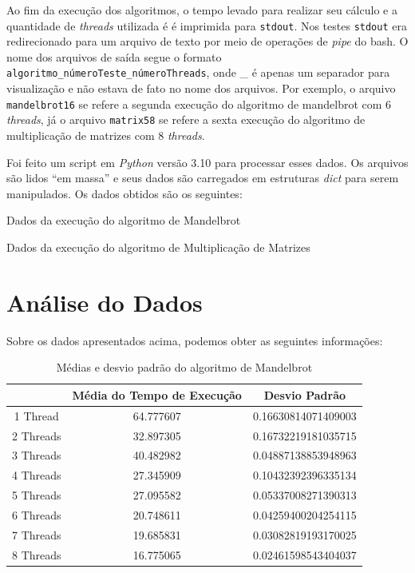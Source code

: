 \documentclass[10pt,a4paper]{article}
\begin{document}
		Ao fim da execução dos algoritmos, o tempo levado para realizar seu cálculo e a quantidade de \textit{threads} utilizada é
		é imprimida para \texttt{stdout}. Nos testes \texttt{stdout} era redirecionado para um arquivo de texto por meio de 
		operações de \textit{pipe} do bash. O nome dos arquivos de saída segue o formato \break \texttt{algoritmo\_númeroTeste\_númeroThreads}, 
		onde \_ é apenas um separador para visualização e não estava de fato no nome dos arquivos.
		Por exemplo, o arquivo \texttt{mandelbrot16} se refere a segunda execução do algoritmo de mandelbrot com 6 \textit{threads}, já o arquivo
		\texttt{matrix58} se refere a sexta execução do algoritmo de multiplicação de matrizes com 8 \textit{threads}.

		Foi feito um script em \textit{Python} versão 3.10 para processar esses dados. Os arquivos são lidos ``em massa'' e seus dados são carregados em
		estruturas \textit{dict} para serem manipulados. Os dados obtidos são os seguintes:

		\begin{table}[htb]
			\begin{adjustwidth}{-1cm}{}
				\caption{Dados da execução do algoritmo de Mandelbrot}
			\end{adjustwidth}
		\end{table}
		\begin{table}[htb]
			\begin{adjustwidth}{-1cm}{}
				\caption{Dados da execução do algoritmo de Multiplicação de Matrizes}
			\end{adjustwidth}
		\end{table}

	\clearpage
	\section{Análise do Dados}

		Sobre os dados apresentados acima, podemos obter as seguintes informações:

		\begin{table}[htb]
			\begin{tabular}{|c|c|c|}
				\hline
				& Média do Tempo de Execução & Desvio Padrão\\ \hline
				1 Thread  & 64.777607 & 0.16630814071409003 \\ \hline
				2 Threads & 32.897305 & 0.16732219181035715 \\ \hline
				3 Threads & 40.482982 & 0.04887138853948963 \\ \hline
				4 Threads & 27.345909 & 0.10432392396335134 \\ \hline
				5 Threads & 27.095582 & 0.05337008271390313 \\ \hline
				6 Threads & 20.748611 & 0.04259400204254115 \\ \hline
				7 Threads & 19.685831 & 0.03082819193170025 \\ \hline
				8 Threads & 16.775065 & 0.02461598543404037 \\ \hline
			\end{tabular}
			\caption{Médias e desvio padrão do algoritmo de Mandelbrot}
		\end{table}
\end{document}
